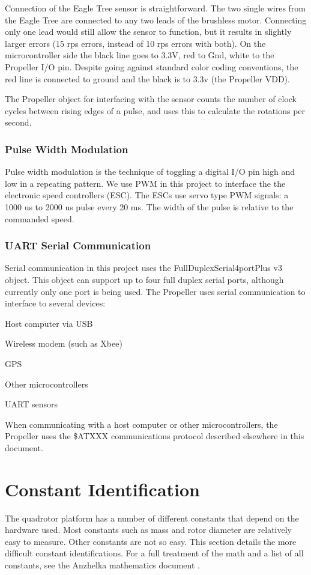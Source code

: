 \documentclass{article}
\numberwithin{equation}{section} %
\begin{document}
Connection of the Eagle Tree sensor is straightforward. The two single wires from the Eagle Tree are connected to any two leads of the brushless motor. Connecting only one lead would still allow the sensor to function, but it results in slightly larger errors (15 rps errors, instead of 10 rps errors with both). On the microcontroller side the black line goes to 3.3V, red to Gnd, white to the Propeller I/O pin. Despite going against standard color coding conventions, the red line is connected to ground and the black is to 3.3v (the Propeller VDD). 

The Propeller object for interfacing with the sensor counts the number of clock cycles between rising edges of a pulse, and uses this to calculate the rotations per second.

\subsubsection{Pulse Width Modulation}
Pulse width modulation is the technique of toggling a digital I/O pin high and low in a repeating pattern. We use PWM in this project to interface the the electronic speed controllers (ESC). The ESCs use servo type PWM signals: a 1000 us to 2000 us pulse every 20 ms. The width of the pulse is relative  to the commanded speed. 


\subsubsection{UART Serial Communication}
Serial communication in this project uses the FullDuplexSerial4portPlus v3 object. This object can support up to four full duplex serial ports, although currently only one port is being used. The Propeller uses serial communication to interface to several devices:
\begin{list}{*}{}
	\item Host computer via USB
	\item Wireless modem (such as Xbee)
	\item GPS
	\item Other microcontrollers
	\item UART sensors
\end{list}
When communicating with a host computer or other microcontrollers, the Propeller uses the \$ATXXX communications protocol described elsewhere in this document.


\section{Constant Identification}
The quadrotor platform has a number of different constants that depend on the hardware used. Most constants such as mass and rotor diameter are relatively easy to measure. Other constants are not so easy. This section details the more difficult constant identifications. For a full treatment of the math and a list of all constants, see the Anzhelka mathematics document \cite{anzhelka_math}.
\end{document}
